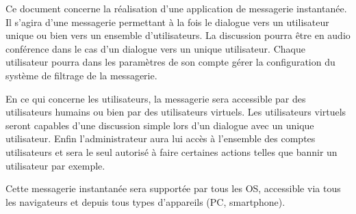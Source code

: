 	Ce document concerne la réalisation d'une application de messagerie instantanée.
	Il s’agira d’une messagerie permettant à la fois le dialogue vers un utilisateur unique ou bien vers un ensemble d’utilisateurs.
	La discussion pourra être en audio conférence dans le cas d’un dialogue vers un unique utilisateur.
	Chaque utilisateur pourra dans les paramètres de son compte gérer la configuration du système de filtrage de la messagerie.

	En ce qui concerne les utilisateurs, la messagerie sera accessible par des utilisateurs humains ou bien par des utilisateurs virtuels.
	Les utilisateurs virtuels seront capables d’une discussion simple lors d’un dialogue avec un unique utilisateur.
	Enfin l’administrateur aura lui accès à l’ensemble des comptes utilisateurs et sera le seul autorisé à faire certaines actions telles que bannir un utilisateur par exemple.

	Cette messagerie instantanée sera supportée par tous les OS, accessible via tous les navigateurs et depuis tous types d’appareils (PC, smartphone).
